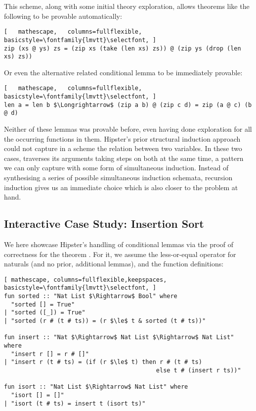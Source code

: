 \vspace{2 mm}

\noindent This scheme, along with some initial theory exploration, allows theorems like the following to be provable automatically:

\begin{lstlisting}[   mathescape,   columns=fullflexible,   basicstyle=\fontfamily{lmvtt}\selectfont, ]
zip (xs @ ys) zs = (zip xs (take (len xs) zs)) @ (zip ys (drop (len xs) zs))
\end{lstlisting}

\noindent Or even the alternative related conditional lemma to be immediately provable:

\begin{lstlisting}[   mathescape,   columns=fullflexible,   basicstyle=\fontfamily{lmvtt}\selectfont, ]
len a = len b $\Longrightarrow$ (zip a b) @ (zip c d) = zip (a @ c) (b @ d)
\end{lstlisting}

Neither of these lemmas was provable before, even having done exploration for all the occurring functions in them.
%
Hipster's prior structural induction approach could not capture in a scheme the relation between two variables.
%
In these two cases,  traverses its arguments taking steps on both at the same time, a pattern we can only capture with some form of simultaneous induction.
%
Instead of synthesising a series of possible simultaneous induction schemata, recursion induction gives us an immediate choice which is also closer to the problem at hand.


\subsection{Interactive Case Study: Insertion Sort}

We here showcase Hipster's handling of conditional lemmas via the proof of correctness for the theorem .
%
For it, we assume the less-or-equal operator \isaCode{$\le$} for naturals (and no prior, additional lemmas), and the function definitions:

\begin{lstlisting}[ mathescape, columns=fullflexible,keepspaces, basicstyle=\fontfamily{lmvtt}\selectfont, ]
fun sorted :: "Nat List $\Rightarrow$ Bool" where
  "sorted [] = True"
| "sorted ([_]) = True"
| "sorted (r # (t # ts)) = (r $\le$ t & sorted (t # ts))"

fun insert :: "Nat $\Rightarrow$ Nat List $\Rightarrow$ Nat List" where
  "insert r [] = r # []"
| "insert r (t # ts) = (if (r $\le$ t) then r # (t # ts)	
                                           else t # (insert r ts))"

fun isort :: "Nat List $\Rightarrow$ Nat List" where
  "isort [] = []"
| "isort (t # ts) = insert t (isort ts)"
\end{lstlisting}

